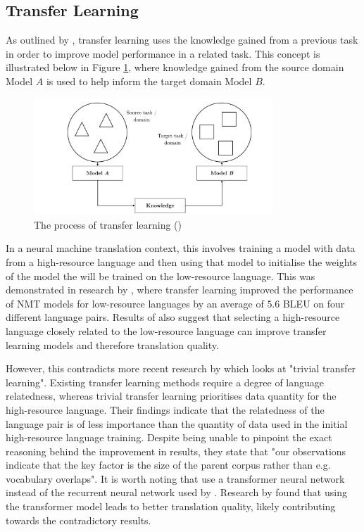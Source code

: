 \subsection{Transfer Learning}

As outlined by \cite{torrey_transfer_2009}, transfer learning uses the knowledge gained from a previous task in order to improve model performance in a related task. This concept is illustrated below in Figure \ref{fig:transfer}, where knowledge gained from the source domain Model $A$ is used to help inform the target domain Model $B$.

\begin{figure}[ht!]
\centering
\includegraphics[width=0.8\textwidth]{media/literature/nmt_approaches/transfer.png}
\caption[Diagram of the transfer learning process]{The process of transfer learning (\cite{ruder_transfer_2019})}
\label{fig:transfer}
\end{figure}


In a neural machine translation context, this involves training a model with data from a high-resource language and then using that model to initialise the weights of the model the will be trained on the low-resource language.
This was demonstrated in research by \cite{zoph_transfer_2016}, where transfer learning improved the performance of \acrshort{NMT} models for low-resource languages by an average of $5.6$ \acrshort{BLEU} on four different language pairs. Results of also suggest that selecting a high-resource language closely related to the low-resource language can improve transfer learning models and therefore translation quality.

However, this contradicts more recent research by \cite{kocmi_trivial_2018} which looks at "trivial transfer learning". Existing transfer learning methods require a degree of language relatedness, whereas trivial transfer learning prioritises data quantity for the high-resource language. Their findings indicate that the relatedness of the language pair is of less importance than the quantity of data used in the initial high-resource language training. Despite being unable to pinpoint the exact reasoning behind the improvement in results, they state that "our observations indicate that the key factor is the size of the parent corpus rather than e.g. vocabulary overlaps".
It is worth noting that \cite{kocmi_trivial_2018} use a transformer neural network instead of the recurrent neural network used by \cite{zoph_transfer_2016}. Research by \cite{popel_training_2018} found that using the transformer model leads to better translation quality, likely contributing towards the contradictory results.


